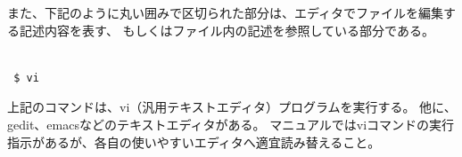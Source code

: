 また、下記のように丸い囲みで区切られた部分は、エディタでファイルを編集する記述内容を表す、
もしくはファイル内の記述を参照している部分である。\\

\\


\begin{verbatim}
 $ vi
\end{verbatim}

上記のコマンドは、vi（汎用テキストエディタ）プログラムを実行する。
他に、gedit、emacsなどのテキストエディタがある。
マニュアルではviコマンドの実行指示があるが、各自の使いやすいエディタへ適宜読み替えること。


